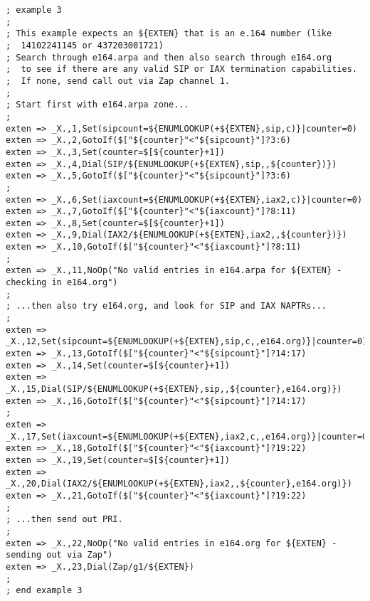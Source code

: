 \begin{verbatim}
; example 3
;
; This example expects an ${EXTEN} that is an e.164 number (like
;  14102241145 or 437203001721)
; Search through e164.arpa and then also search through e164.org
;  to see if there are any valid SIP or IAX termination capabilities.
;  If none, send call out via Zap channel 1.
;
; Start first with e164.arpa zone...
;
exten => _X.,1,Set(sipcount=${ENUMLOOKUP(+${EXTEN},sip,c)}|counter=0)
exten => _X.,2,GotoIf($["${counter}"<"${sipcount}"]?3:6)
exten => _X.,3,Set(counter=$[${counter}+1])
exten => _X.,4,Dial(SIP/${ENUMLOOKUP(+${EXTEN},sip,,${counter})})
exten => _X.,5,GotoIf($["${counter}"<"${sipcount}"]?3:6)
;
exten => _X.,6,Set(iaxcount=${ENUMLOOKUP(+${EXTEN},iax2,c)}|counter=0)
exten => _X.,7,GotoIf($["${counter}"<"${iaxcount}"]?8:11)
exten => _X.,8,Set(counter=$[${counter}+1])
exten => _X.,9,Dial(IAX2/${ENUMLOOKUP(+${EXTEN},iax2,,${counter})})
exten => _X.,10,GotoIf($["${counter}"<"${iaxcount}"]?8:11)
;
exten => _X.,11,NoOp("No valid entries in e164.arpa for ${EXTEN} - checking in e164.org")
;
; ...then also try e164.org, and look for SIP and IAX NAPTRs...
;
exten => _X.,12,Set(sipcount=${ENUMLOOKUP(+${EXTEN},sip,c,,e164.org)}|counter=0)
exten => _X.,13,GotoIf($["${counter}"<"${sipcount}"]?14:17)
exten => _X.,14,Set(counter=$[${counter}+1])
exten => _X.,15,Dial(SIP/${ENUMLOOKUP(+${EXTEN},sip,,${counter},e164.org)})
exten => _X.,16,GotoIf($["${counter}"<"${sipcount}"]?14:17)
;
exten => _X.,17,Set(iaxcount=${ENUMLOOKUP(+${EXTEN},iax2,c,,e164.org)}|counter=0)
exten => _X.,18,GotoIf($["${counter}"<"${iaxcount}"]?19:22)
exten => _X.,19,Set(counter=$[${counter}+1])
exten => _X.,20,Dial(IAX2/${ENUMLOOKUP(+${EXTEN},iax2,,${counter},e164.org)})
exten => _X.,21,GotoIf($["${counter}"<"${iaxcount}"]?19:22)
;
; ...then send out PRI.
;
exten => _X.,22,NoOp("No valid entries in e164.org for ${EXTEN} - sending out via Zap")
exten => _X.,23,Dial(Zap/g1/${EXTEN})
;
; end example 3

\end{verbatim}
